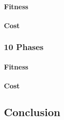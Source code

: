 \paragraph{Fitness}
\paragraph{Cost}

\subsubsection{10 Phases}
\paragraph{Fitness}
\paragraph{Cost}


\subsection{Conclusion}
